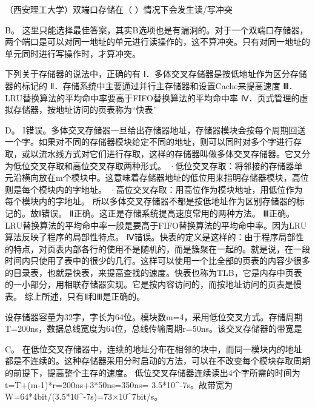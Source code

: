 \question （西安理工大学）双端口存储在（ ）情况下会发生读/写冲突
\par{}
\begin{solution}B。
这里只能选择最佳答案，其实B选项也是有漏洞的。对于一个双端口存储器，两个端口是可以对同一地址的单元进行读操作的，这不算冲突。只有对同一地址的单元同时进行写操作时，才算冲突。
\end{solution}
\question 下列关于存储器的说法中，正确的有
Ⅰ．多体交叉存储器是按低地址作为区分存储器的标记的
Ⅱ．存储系统中主要通过并行主存储器和设置Cache来提高速度
Ⅲ．LRU替换算法的平均命中率要高于FIFO替换算法的平均命中率
Ⅳ．页式管理的虚拟存储器，按地址访问的页表称为``快表''
\par{}
\begin{solution}D。
I错误。多体交叉存储器一旦给出存储器地址，存储器模块会按每个周期回送一个字。如果对不同的存储器模块给定不同的地址，则可以同时对多个字进行存取，或以流水线方式对它们进行存取，这样的存储器叫做多体交叉存储器。它又分为低位交叉存取和高位交叉存取两种形式。
·低位交叉存取：将邻接的存储器单元沿横向放在m个模块中。这意味着存储器地址的低位用来指明存储器模块，高位则是每个模块内的字地址。
·高位交叉存取：用高位作为模块地址，用低位作为每个模块内的字地址。
所以多体交叉存储器不都是按低地址作为区别存储器的标记的。故Ⅰ错误。
Ⅱ正确。这正是存储系统提高速度常用的两种方法。
Ⅲ正确。LRU替换算法的平均命中率一般是要高于FIFO替换算法的平均命中率。因为LRU算法反映了程序的局部性特点。
Ⅳ错误。快表的定义是这样的：由于程序局部性的特点，对页表内部各行的使用不是随机的，而是簇聚在一起的。就是说，在一段时间内只使用了表中的很少的几行。这样可以使用一个比全部的页表的内容少很多的目录表，也就是快表，来提高查找的速度。快表也称为TLB，它是内存中页表的一小部分，用相联存储器实现。它是按内容访问的，而按地址访问的页表是慢表。
综上所述，只有Ⅱ和Ⅲ是正确的。
\end{solution}
\question 设存储器容量为32字，字长为64位。模块数m=4，采用低位交叉方式。存储周期T=200ns，数据总线宽度为64位，总线传输周期r=50ns。该交叉存储器的带宽是
\par{}
\begin{solution}C。
在低位交叉存储器中，连续的地址分布在相邻的块中，而同一模块内的地址都是不连续的。这种存储器采用分时启动的方法，可以在不改变每个模块存取周期的前提下，提高整个主存的速度。
低位交叉存储器连续读出4个字所需的时间为t=T+(m-1)*r=200ns+3*50ns=350ns=
3.5*10\^{}-7s。故带宽为W=64*4bit/(3.5*10\^{}-7s)=73×10\^{}7bit/s。
\end{solution}
